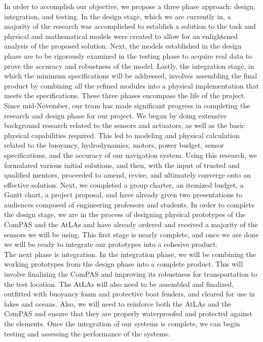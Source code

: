\documentclass[11pt]{article}
\begin{document}
In order to accomplish our objective, we propose a three phase approach: design, integration, and testing. In the design stage, which we are currently in, a majority of the research was accomplished to establish a solution to the task and physical and mathematical models were created to allow for an enlightened analysis of the proposed solution. Next, the models established in the design phase are to be rigorously examined in the testing phase to acquire real data to prove the accuracy and robustness of the model. Lastly, the integration stage, in which the minimum specifications will be addressed, involves assembling the final product by combining all the refined modules into a physical implementation that meets the specifications. These three phases encompass the life of the project. \\

Since mid-November, our team has made significant progress in completing the research and design phase for our project. We began by doing extensive background research related to the sensors and actuators, as well as the basic physical capabilities required. This led to modeling and physical calculation related to the buoyancy, hydrodynamics, motors, power budget, sensor specifications, and the accuracy of our navigation system. Using this research, we formulated various initial solutions, and then, with the input of trusted and qualified mentors, proceeded to amend, revise, and ultimately converge onto an effective solution. Next, we completed a group charter, an itemized budget, a Gantt chart, a project proposal, and have already given two presentations to audiences composed of engineering professors and students. In order to complete the design stage, we are in the process of designing physical prototypes of the ComPAS and the AtLAs and have already ordered and received a majority of the sensors we will be using. This first stage is nearly complete, and once we are done we will be ready to integrate our prototypes into a cohesive product.\\

The next phase is integration. In the integration phase, we will be combining the working prototypes from the design phase into a complete product. This will involve finalizing the ComPAS and improving its robustness for transportation to the test location. The AtLAs will also need to be assembled and finalized, outfitted with buoyancy foam and protective boat fenders, and cleared for use in lakes and oceans. Also, we will need to reinforce both the AtLAs and the ComPAS and ensure that they are properly waterproofed and protected against the elements. Once the integration of our systems is complete, we can begin testing and assessing the performance of the systems.\\
\end{document}
